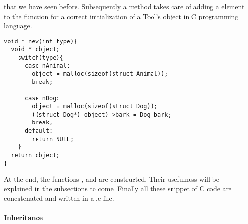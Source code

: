 that we have seen before. %
Subsequently a method \lstset{style=customc}{\lstinline[basicstyle=\small\ttfamily]|addStructConstructor|}
takes care of adding a \lstset{style=customc}{\lstinline[basicstyle=\small\ttfamily]|case|} element
to the \lstset{style=customc}{\lstinline[basicstyle=\small\ttfamily]|new|} function for a correct
initialization of a Tool's object in C programming language.
\begin{lstlisting}[caption={In the case of the example used in the section 2. Examples}, captionpos=b]
void * new(int type){
  void * object;
    switch(type){
      case nAnimal:
        object = malloc(sizeof(struct Animal));
        break;

      case nDog:
        object = malloc(sizeof(struct Dog));
        ((struct Dog*) object)->bark = Dog_bark;
        break;
      default:
        return NULL;
    }
  return object;
}
\end{lstlisting}
At the end, the functions
\newline
\lstset{style=customc}{\lstinline[basicstyle=\small\ttfamily]|void helper_reverse_plus(char str[], int len)|},
\lstset{style=customc}{\lstinline[basicstyle=\small\ttfamily]|char* itoa(int num)|} and
\lstset{style=customc}{\lstinline[basicstyle=\small\ttfamily]|int * arrayAlloc(int size)|} are constructed.
Their usefulness will be explained in the subsections to come.
\newline
Finally all these snippet of C code are concatenated and written in a .c file.
\newline
\paragraph{Inheritance}

